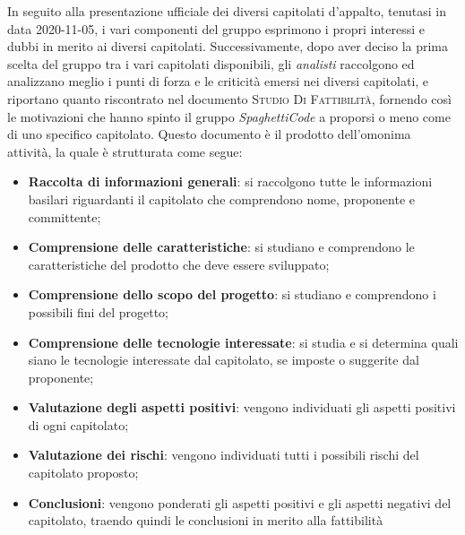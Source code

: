 In seguito alla presentazione ufficiale dei diversi capitolati d'appalto, tenutasi in data 2020-11-05, i vari componenti 
del gruppo esprimono i propri interessi e dubbi in merito ai diversi capitolati.
Successivamente, dopo aver deciso la prima scelta del gruppo tra i vari capitolati disponibili, gli \emph{analisti} 
raccolgono ed analizzano meglio i punti di forza e le criticità emersi nei diversi capitolati, e riportano quanto 
riscontrato nel documento \textsc{Studio Di Fattibilità}, fornendo così le motivazioni che hanno spinto il gruppo 
\emph{SpaghettiCode} a proporsi o meno come  di uno specifico capitolato. Questo documento è il 
prodotto dell'omonima attività, la quale è strutturata come segue: 
\begin{itemize}
    \item \textbf{Raccolta di informazioni generali}: si raccolgono tutte le informazioni basilari riguardanti il 
    capitolato che comprendono nome, proponente e committente;
    \item \textbf{Comprensione delle caratteristiche}: si studiano e comprendono le caratteristiche del prodotto che 
    deve essere sviluppato;
    \item \textbf{Comprensione dello scopo del progetto}: si studiano e comprendono i possibili fini del progetto;
    \item \textbf{Comprensione delle tecnologie interessate}: si studia e si determina quali siano le tecnologie 
    interessate dal capitolato, se imposte o suggerite dal proponente;
    \item \textbf{Valutazione degli aspetti positivi}: vengono individuati gli aspetti positivi di ogni capitolato;
    \item \textbf{Valutazione dei rischi}: vengono individuati tutti i possibili rischi del capitolato proposto;  
    \item \textbf{Conclusioni}: vengono ponderati gli aspetti positivi e gli aspetti negativi del capitolato, traendo 
    quindi le conclusioni in merito alla fattibilità
\end{itemize}

